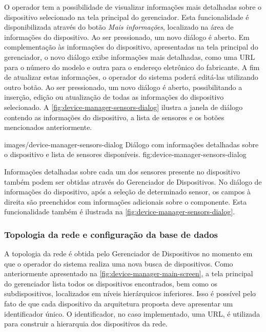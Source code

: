 O operador tem a possibilidade de visualizar informações mais detalhadas sobre o dispositivo
selecionado na tela principal do gerenciador. Esta funcionalidade é disponibilizada através do botão
\emph{Mais informações}, localizado na área de informações do dispositivo. Ao ser pressionado, um
novo diálogo é aberto. Em complementação às informações do dispositivo, apresentadas na tela
principal do gerenciador, o novo diálogo exibe informações mais detalhadas, como uma \gls{URL} para
o número do modelo e outra para o endereço eletrônico do fabricante. A fim de atualizar estas
informações, o operador do sistema poderá editá-las utilizando outro botão. Ao ser pressionado, um
novo diálogo é aberto, possibilitando a inserção, edição ou atualização de todas as informações do
dispositivo selecionado. A \cref{fig:device-manager-sensors-dialog} ilustra a janela de diálogo
contendo as informações do dispositivo, a lista de sensores e os botões mencionados anteriormente.

  {images/device-manager-sensors-dialog}
  {Diálogo com informações detalhadas sobre o dispositivo e lista de sensores disponíveis.}
  {fig:device-manager-sensors-dialog}


Informações detalhadas sobre cada um dos sensores presente no dispositivo também podem ser obtidas
através do Gerenciador de Dispositivos. No diálogo de informações do dispositivo, após a seleção de
determinado sensor, os campos à direita são preenchidos com informações adicionais sobre o
componente. Esta funcionalidade também é ilustrada na \cref{fig:device-manager-sensors-dialog}.


\subsubsection{Topologia da rede e configuração da base de dados}

A topologia da rede é obtida pelo Gerenciador de Dispositivos no momento em que o operador do
sistema realiza uma nova busca de dispositivos. Como anteriormente apresentado na
\cref{fig:device-manager-main-screen}, a tela principal do gerenciador lista todos os dispositivos
encontrados, bem como os subdispositivos, localizados em níveis hierárquicos inferiores. Isso é
possível pelo fato de que cada dispositivo da arquitetura proposta deve apresentar um identificador
único. O identificador, no caso implementado, uma \gls{URL}, é utilizada para construir a hierarquia
dos dispositivos da rede.


